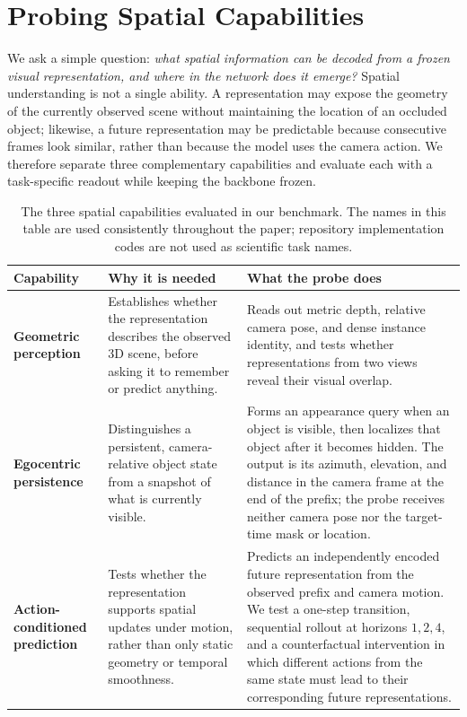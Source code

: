 \section{Probing Spatial Capabilities}
\label{sec:formal-framework}

We ask a simple question: \emph{what spatial information can be decoded from a
frozen visual representation, and where in the network does it emerge?}
Spatial understanding is not a single ability. A representation may expose
the geometry of the currently observed scene without maintaining the location
of an occluded object; likewise, a future representation may be predictable
because consecutive frames look similar, rather than because the model uses
the camera action. We therefore separate three complementary capabilities and
evaluate each with a task-specific readout while keeping the backbone frozen.

\begin{table}[t]
  \centering
  \small
  \setlength{\tabcolsep}{5pt}
  \begin{tabular}{p{}p{}p{}}
    \toprule
    \textbf{Capability} & \textbf{Why it is needed} & \textbf{What the probe does} \\
    \midrule
    \textbf{Geometric perception}
      & Establishes whether the representation describes the observed 3D
        scene, before asking it to remember or predict anything.
      & Reads out metric depth, relative camera pose, and dense instance identity,
        and tests whether representations from two views reveal their visual
        overlap. \\
    \textbf{Egocentric persistence}
      & Distinguishes a persistent, camera-relative object state from a
        snapshot of what is currently visible.
      & Forms an appearance query when an object is visible, then localizes
        that object after it becomes hidden. The output is its azimuth,
        elevation, and distance in the camera frame at the end of the prefix;
        the probe receives neither camera pose nor the target-time mask or
        location. \\
    \textbf{Action-conditioned prediction}
      & Tests whether the representation supports spatial updates under
        motion, rather than only static geometry or temporal smoothness.
      & Predicts an independently encoded future representation from the
        observed prefix and camera motion. We test a one-step transition,
        sequential rollout at horizons $1,2,4$, and a counterfactual
        intervention in which different actions from the same state must lead
        to their corresponding future representations. \\
    \bottomrule
  \end{tabular}
  \caption{The three spatial capabilities evaluated in our benchmark. The
  names in this table are used consistently throughout the paper; repository
  implementation codes are not used as scientific task names.}
  \label{tab:spatial-capabilities}
\end{table}

